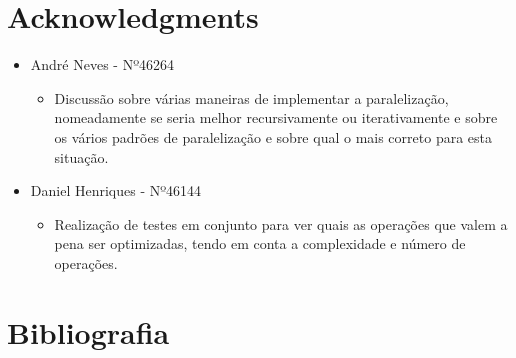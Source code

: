 \documentclass[a4paper]{article}
\begin{document}
\section{Acknowledgments}
\begin{itemize}
\item André Neves - Nº46264
\begin{itemize}
\item Discussão sobre várias maneiras de implementar a paralelização, nomeadamente se seria melhor recursivamente ou iterativamente e sobre os vários padrões de paralelização e sobre qual o mais correto para esta situação.
\end{itemize}
\item Daniel Henriques - Nº46144
\begin{itemize}
\item Realização de testes em conjunto para ver quais as operações que valem a pena ser optimizadas, tendo em conta a complexidade e número de operações.
\end{itemize}

\end{itemize}

\section{Bibliografia}
\end{document}
